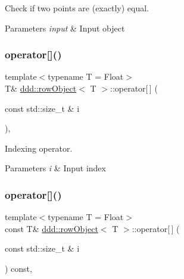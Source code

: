 Check if two points are (exactly) equal. 


\begin{DoxyParams}{Parameters}
{\em input} & Input object \\
\hline
\end{DoxyParams}
\mbox{\label{classddd_1_1row_object_aff4fdb32f8b837e224b26de2bcecc7d2}} 
\subsubsection{\texorpdfstring{operator[]()}{operator[]()}\hspace{0.1cm}{\footnotesize\ttfamily [1/2]}}
{\footnotesize\ttfamily template$<$typename T  = Float$>$ \\
T\& \hyperlink{classddd_1_1row_object}{ddd\+::row\+Object}$<$ T $>$\+::operator\mbox{[}$\,$\mbox{]} (\begin{DoxyParamCaption}\item[{const std\+::size\+\_\+t \&}]{i }\end{DoxyParamCaption})\hspace{0.3cm}{\ttfamily [inline]}, {\ttfamily [inherited]}}



Indexing operator. 


\begin{DoxyParams}{Parameters}
{\em i} & Input index \\
\hline
\end{DoxyParams}
\mbox{\label{classddd_1_1row_object_a60418f8af09e6913d16b48f2cb53e826}} 
\subsubsection{\texorpdfstring{operator[]()}{operator[]()}\hspace{0.1cm}{\footnotesize\ttfamily [2/2]}}
{\footnotesize\ttfamily template$<$typename T  = Float$>$ \\
const T\& \hyperlink{classddd_1_1row_object}{ddd\+::row\+Object}$<$ T $>$\+::operator\mbox{[}$\,$\mbox{]} (\begin{DoxyParamCaption}\item[{const std\+::size\+\_\+t \&}]{i }\end{DoxyParamCaption}) const\hspace{0.3cm}{\ttfamily [inline]}, {\ttfamily [inherited]}}



